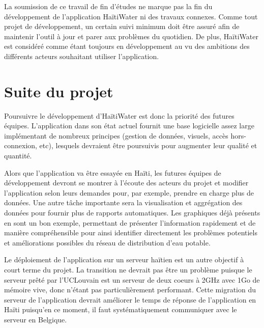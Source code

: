 \documentclass{EPL-master-thesis-covers-FR}
\begin{document}
		La soumission de ce travail de fin d'études ne marque pas la fin du développement de l'application HaïtiWater ni des travaux connexes. Comme tout projet de développement, un certain suivi minimum doit être assuré afin de maintenir l'outil à jour et parer aux problèmes du quotidien. De plus, HaïtiWater est considéré comme étant toujours en développement au vu des ambitions des différents acteurs souhaitant utiliser l'application.

		\section{Suite du projet}
			\label{ref:suite_projet}

			Poursuivre le développement d'HaïtiWater est donc la priorité des futures équipes. L'application dans son état actuel fournit une base logicielle assez large implémentant de nombreux principes (gestion de données, visuels, accès hors-connexion, etc), lesquels devraient être poursuivis pour augmenter leur qualité et quantité.

			Alors que l'application va être essayée en Haïti, les futures équipes de développement devront se montrer à l'écoute des acteurs du projet et modifier l'application selon leurs demandes pour, par exemple, prendre en charge plus de données. Une autre tâche importante sera la visualisation et aggrégation des données pour fournir plus de rapports automatiques. Les graphiques déjà présents en sont un bon exemple, permettant de présenter l'information rapidement et de manière compréhensible pour ainsi identifier directement les problèmes potentiels et améliorations possibles du réseau de distribution d'eau potable.

			Le déploiement de l'application sur un serveur haïtien est un autre objectif à court terme du projet. La transition ne devrait pas être un problème puisque le serveur prêté par l'UCLouvain est un serveur de deux coeurs à 2GHz avec 1Go de mémoire vive, donc n'étant pas particulièrement performant. Cette migration du serveur de l'application devrait améliorer le temps de réponse de l'application en Haïti puisqu'en ce moment, il faut systématiquement communiquer avec le serveur en Belgique.
\end{document}

